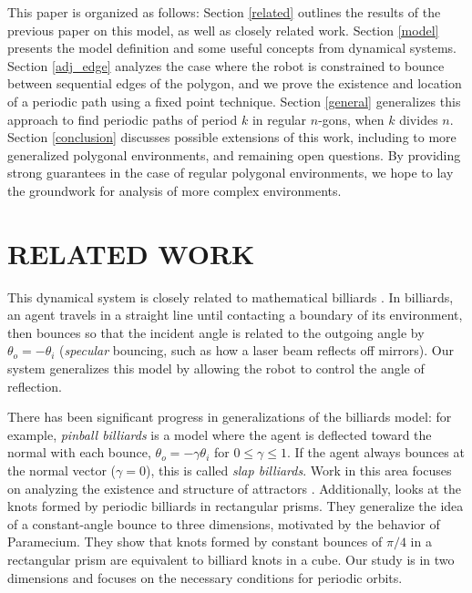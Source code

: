 \documentclass[letterpaper, 10 pt, conference]{ieeeconf}  %
\begin{document}
This paper is organized as follows: Section \ref{related} outlines the results of the
previous paper on this model, as well as closely related work.
Section \ref{model} presents the model definition and
some useful concepts from dynamical systems. Section \ref{adj_edge} analyzes the 
case where the robot is constrained to bounce between sequential edges of the
polygon, and we prove the existence and location of a periodic path using a
fixed point technique.
Section \ref{general} generalizes this approach to find periodic paths of period $k$ in
regular $n$-gons, when $k$ divides $n$. Section \ref{conclusion} discusses possible extensions
of this work, including to more generalized polygonal environments, and
remaining open questions. By providing strong guarantees in the case of regular
polygonal environments, we hope to lay the groundwork for analysis of more
complex environments. 


\section{RELATED WORK\label{related}} 

This dynamical system is closely related to mathematical billiards
\cite{billiards}. In billiards, an agent travels in a straight line until
contacting a boundary of its environment, then bounces so that the incident
angle is related to the outgoing angle by $\theta_{o} = -\theta_{i}$
(\textit{specular} bouncing, such as how a laser beam
reflects off mirrors). Our system
generalizes this model by allowing the robot to control the angle of reflection.

There has been significant progress in generalizations of the billiards model: for example, 
\textit{pinball billiards} is a model where the agent is deflected toward the
normal with each bounce, $\theta_{o} = - \gamma \theta_{i}$ for
$0 \leq \gamma \leq 1$. If the agent always bounces at the normal vector
($\gamma = 0$), this is called \textit{slap billiards}. Work in this area focuses on
analyzing the existence and structure of attractors \cite{pinball} \cite{DelMagno2014}.
Additionally, \cite{Jones1998} looks at the knots formed by periodic billiards
in rectangular prisms. They generalize
the idea of a constant-angle bounce to
three dimensions, motivated by the behavior of Paramecium. They show that knots
formed by constant bounces of $\pi/4$ in a rectangular prism are equivalent to
billiard knots in a cube. Our study is in two dimensions and focuses on the
necessary conditions for periodic orbits.
\end{document}

